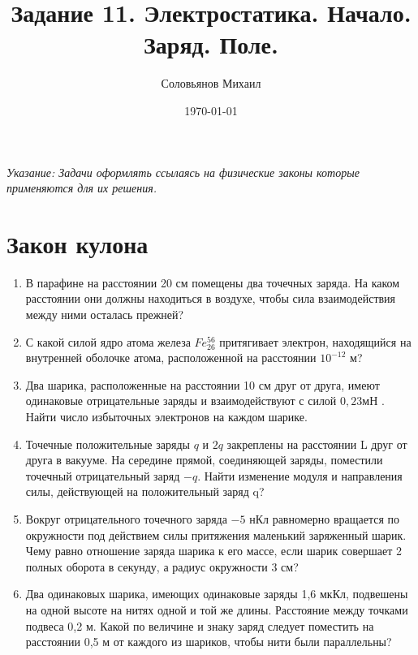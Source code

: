 \documentclass[a4paper,12pt]{article} %
\author{Соловьянов Михаил }
\title{Задание 11. Электростатика.  Начало. Заряд. Поле.}
\date{\today}
\begin{document}
\maketitle



\textit{Указание: Задачи оформлять ссылаясь на физические законы которые применяются для их решения.}




\section{Закон кулона}
\begin{enumerate}

	\item В парафине на расстоянии 20 см помещены два точечных заряда. На каком расстоянии они должны находиться в воздухе, чтобы сила взаимодействия между ними осталась прежней?

	\item С какой силой ядро атома железа $ Fe^{56}_{26} $ притягивает электрон, находящийся на внутренней оболочке атома, расположенной на расстоянии $ 10^{-12} $ м?

	\item Два шарика, расположенные на расстоянии 10 см друг от друга, имеют одинаковые отрицательные заряды и взаимодействуют с силой $0,23 мН$ . Найти число избыточных электронов на каждом шарике.

	\item Точечные положительные заряды $q$ и $ 2q $ закреплены на расстоянии L друг от друга в вакууме. На середине прямой, соединяющей заряды, поместили точечный отрицательный заряд $−q$. Найти изменение модуля и направления силы, действующей на положительный заряд q?

	\item Вокруг отрицательного точечного заряда $-5$ нКл равномерно вращается по окружности под действием силы притяжения маленький заряженный шарик. Чему равно отношение заряда шарика к его массе, если шарик совершает 2 полных оборота в секунду, а радиус окружности 3 см?

	\item  Два одинаковых шарика, имеющих одинаковые заряды 1,6 мкКл, подвешены на одной высоте на нитях одной и той же длины. Расстояние между точками подвеса 0,2 м. Какой по величине и знаку заряд следует поместить на расстоянии 0,5 м от каждого из шариков, чтобы нити были параллельны?

\end{enumerate}
\end{document}
